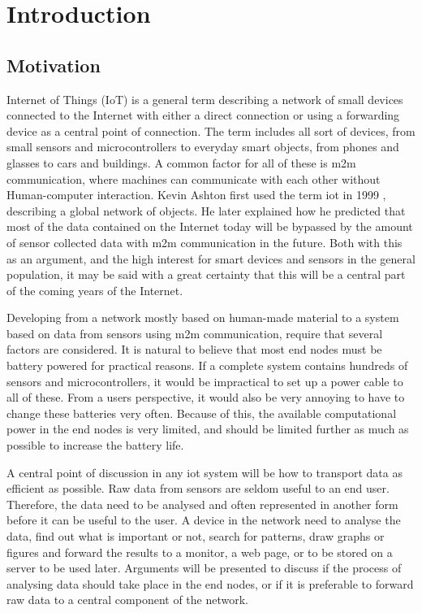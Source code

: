 \chapter{Introduction}
\label{chp:introduction} 


\section{Motivation}

\noindent Internet of Things (IoT) is a general term describing a network of small devices connected to the Internet with either a direct connection or using a forwarding device as a central point of connection. The term includes all sort of devices, from small sensors and \glspl{microcontroller} to everyday smart objects, from phones and glasses to cars and buildings. A common factor for all of these is \gls{m2m} communication, where machines can communicate with each other without Human-computer interaction. Kevin Ashton first used the term \gls{iot} in 1999 \cite{ashton2009internet}, describing a global network of objects. He later explained how he predicted that most of the data contained on the Internet today will be bypassed by the amount of sensor collected data with \gls{m2m} communication in the future. Both with this as an argument, and the high interest for smart devices and sensors in the general population, it may be said with a great certainty that this will be a central part of the coming years of the Internet. 

\noindent Developing from a network mostly based on human-made material to a system based on data from sensors using \gls{m2m} communication, require that several factors are considered. It is natural to believe that most end nodes must be battery powered for practical reasons. If a complete system contains hundreds of sensors and \glspl{microcontroller}, it would be impractical to set up a power cable to all of these. From a users perspective, it would also be very annoying to have to change these batteries very often. Because of this, the available computational power in the end nodes is very limited, and should be limited further as much as possible to increase the battery life. 

\noindent A central point of discussion in any \gls{iot} system will be how to transport data as efficient as possible. Raw data from sensors are seldom useful to an end user. Therefore, the data need to be analysed and often represented in another form before it can be useful to the user. A device in the network need to analyse the data, find out what is important or not, search for patterns, draw graphs or figures and forward the results to a monitor, a web page, or to be stored on a server to be used later. Arguments will be presented to discuss if the process of analysing data should take place in the end nodes, or if it is preferable to forward raw data to a central component of the network. 


